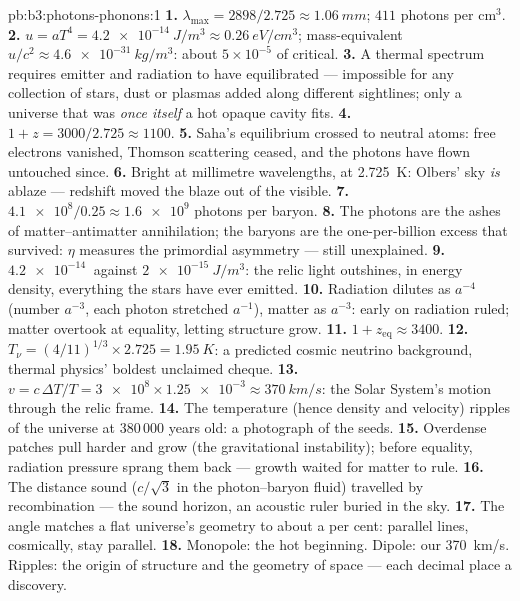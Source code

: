 \begin{solution}{pb:b3:photons-phonons:1}
\textbf{1.} $\lambda_{\max} = 2898/2.725 \approx \qty{1.06}{mm}$;
$411$ photons per cm$^3$.
\textbf{2.} $u = aT^4 = \qty{4.2e-14}{J/m^3} \approx
\qty{0.26}{eV/cm^3}$; mass-equivalent $u/c^2 \approx
\qty{4.6e-31}{kg/m^3}$: about $5\times10^{-5}$ of critical.
\textbf{3.} A thermal spectrum requires emitter and radiation to
have equilibrated --- impossible for any collection of stars,
dust or plasmas added along different sightlines; only a
universe that was \emph{once itself} a hot opaque cavity fits.
\textbf{4.} $1 + z = 3000/2.725 \approx 1100$.
\textbf{5.} Saha's equilibrium crossed to neutral atoms: free
electrons vanished, Thomson scattering ceased, and the photons
have flown untouched since.
\textbf{6.} Bright at millimetre wavelengths, at
\qty{2.725}{K}: Olbers' sky \emph{is} ablaze --- redshift moved
the blaze out of the visible.
\textbf{7.} $\num{4.1e8}/0.25 \approx \num{1.6e9}$ photons per
baryon.
\textbf{8.} The photons are the ashes of matter--antimatter
annihilation; the baryons are the one-per-billion excess that
survived: $\eta$ measures the primordial asymmetry --- still
unexplained.
\textbf{9.} $\qty{4.2e-14}{}$ against $\qty{2e-15}{J/m^3}$: the
relic light outshines, in energy density, everything the stars
have ever emitted.
\textbf{10.} Radiation dilutes as $a^{-4}$ (number $a^{-3}$,
each photon stretched $a^{-1}$), matter as $a^{-3}$: early on
radiation ruled; matter overtook at equality, letting structure
grow.
\textbf{11.} $1 + z_{\text{eq}} \approx 3400$.
\textbf{12.} $T_\nu = (4/11)^{1/3} \times 2.725 =
\qty{1.95}{K}$: a predicted cosmic neutrino background, thermal
physics' boldest unclaimed cheque.
\textbf{13.} $v = c\,\Delta T/T = \num{3e8} \times \num{1.25e-3}
\approx \qty{370}{km/s}$: the Solar System's motion through the
relic frame.
\textbf{14.} The temperature (hence density and velocity)
ripples of the universe at 380\,000 years old: a photograph of
the seeds.
\textbf{15.} Overdense patches pull harder and grow (the
gravitational instability); before equality, radiation pressure
sprang them back --- growth waited for matter to rule.
\textbf{16.} The distance sound ($c/\sqrt3$ in the
photon--baryon fluid) travelled by recombination --- the sound
horizon, an acoustic ruler buried in the sky.
\textbf{17.} The angle matches a flat universe's geometry to
about a per cent: parallel lines, cosmically, stay parallel.
\textbf{18.} Monopole: the hot beginning. Dipole: our
\qty{370}{km/s}. Ripples: the origin of structure and the
geometry of space --- each decimal place a discovery.

\end{solution}
